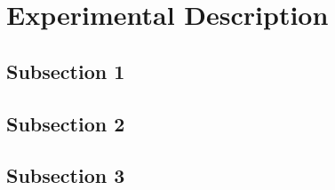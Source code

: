 \documentclass[../main.tex]{subfiles}
\begin{document}
\section{Experimental Description}

\subsection{Subsection 1}

\lipsum[1]

\subsection{Subsection 2}

\lipsum[2]

\subsection{Subsection 3}

\lipsum[3]
\end{document}
